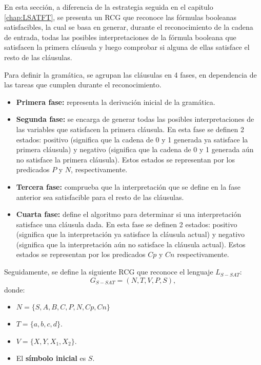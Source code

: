 \documentclass[12pt]{article}
\begin{document}
En esta sección, a diferencia de la estrategia seguida en el capitulo \ref{chap:LSATFT}, se presenta un RCG que reconoce las fórmulas booleanas satisfacibles, la cual se basa en generar, durante el reconocimiento de la cadena de entrada, todas las posibles interpretaciones de la fórmula booleana que satisfacen la primera cláusula y luego comprobar si alguna de ellas satisface el resto de las cláusulas.

Para definir la gramática, se agrupan las cláusulas en 4 fases, en dependencia de las tareas que cumplen durante el reconocimiento.

\begin{itemize}
    \item \textbf{Primera fase:} representa la derivación inicial de la gramática.
    \item \textbf{Segunda fase:} se encarga de generar todas las posibles interpretaciones
          de las variables que satisfacen la primera cláusula. En esta fase se definen 2 estados: positivo (significa
          que la cadena de 0 y 1 generada ya satisface la primera cláusula) y negativo (significa que la cadena de 0 y 1
          generada aún no satisface la primera cláusula). Estos estados se representan por los predicados $P$ y $N$, respectivamente.
          
    \item \textbf{Tercera fase:} comprueba que la interpretación que se define en la fase anterior sea satisfacible para
          el resto de las cláusulas.
    \item \textbf{Cuarta fase:} define el algoritmo para determinar si una interpretación satisface una cláusula
          dada. En esta fase se definen 2 estados: positivo (significa que la interpretación ya satisface la cláusula 
          actual) y negativo (significa que la interpretación aún no satisface la cláusula actual). Estos estados se representan por los predicados $Cp$ y $Cn$ respectivamente.
          
\end{itemize}

Seguidamente, se define la siguiente RCG que reconoce el lenguaje $L_{S-SAT}$:
\[
    G_{S-SAT} = (N, T, V, P, S),
\]
donde:

\begin{itemize}
    \item $N=\{S,A,B,C,P,N,Cp,Cn\}$
    \item $T=\{a,b,c,d\}$.
    \item $V=\{X,Y,X_1,X_2\}$.
    \item El \textbf{símbolo inicial} es $S$.
\end{itemize}
\end{document}
